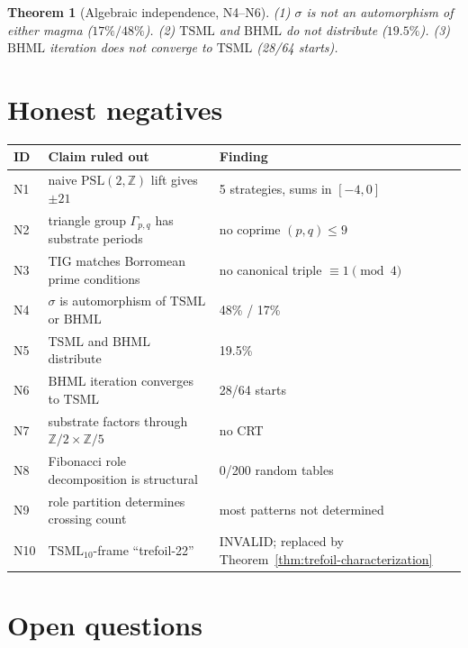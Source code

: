 \documentclass[11pt,reqno]{amsart}
\theoremstyle{plain}
\newtheorem{theorem}{Theorem}[section]
\theoremstyle{definition}
\theoremstyle{remark}
\newcommand{\Z}{\mathbb{Z}}
\newcommand{\TS}{\mathrm{TSML}}
\newcommand{\BH}{\mathrm{BHML}}
\newcommand{\sig}{\sigma}
\begin{document}
\begin{theorem}[Algebraic independence, N4--N6]\label{thm:alg-indep}
(1) $\sig$ is not an automorphism of either magma ($17\%/48\%$).
(2) $\TS$ and $\BH$ do not distribute ($19.5\%$).
(3) $\BH$ iteration does not converge to $\TS$ (28/64 starts).
\end{theorem}

\section{Honest negatives}
\label{sec:negatives}

\begin{center}
\begin{tabular}{lll}
\toprule
ID & Claim ruled out & Finding \\
\midrule
N1 & naive $\mathrm{PSL}(2, \Z)$ lift gives $\pm 21$ & 5 strategies, sums in $[-4, 0]$ \\
N2 & triangle group $\Gamma_{p,q}$ has substrate periods & no coprime $(p,q) \le 9$ \\
N3 & TIG matches Borromean prime conditions & no canonical triple $\equiv 1 \pmod 4$ \\
N4 & $\sig$ is automorphism of $\TS$ or $\BH$ & 48\% / 17\% \\
N5 & $\TS$ and $\BH$ distribute & 19.5\% \\
N6 & $\BH$ iteration converges to $\TS$ & 28/64 starts \\
N7 & substrate factors through $\Z/2 \times \Z/5$ & no CRT \\
N8 & Fibonacci role decomposition is structural & 0/200 random tables \\
N9 & role partition determines crossing count & most patterns not determined \\
N10 & $\TS_{10}$-frame ``trefoil-22'' & INVALID; replaced by Theorem~\ref{thm:trefoil-characterization} \\
\bottomrule
\end{tabular}
\end{center}

\section{Open questions}
\end{document}
